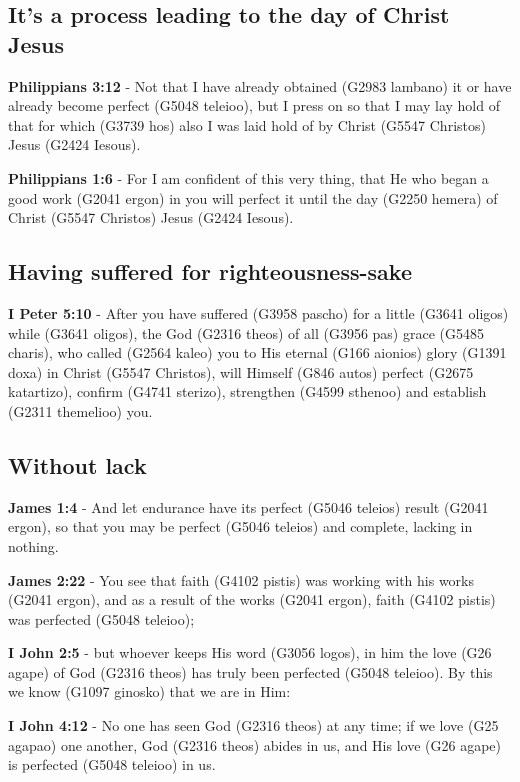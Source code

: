 \documentclass[11pt]{article}
\begin{document}
\subsection{It's a process leading to the day of Christ Jesus}
\label{sec:org4582511}
\textbf{Philippians 3:12} - Not that I have already obtained (G2983 lambano) it or have already become perfect (G5048 teleioo), but I press on so that I may lay hold of that for which (G3739 hos) also I was laid hold of by Christ (G5547 Christos) Jesus (G2424 Iesous).

\textbf{Philippians 1:6} - For I am confident of this very thing, that He who began a good work (G2041 ergon) in you will perfect it until the day (G2250 hemera) of Christ (G5547 Christos) Jesus (G2424 Iesous).

\subsection{Having suffered for righteousness-sake}
\label{sec:org2d60e89}
\textbf{I Peter 5:10} - After you have suffered (G3958 pascho) for a little (G3641 oligos) while (G3641 oligos), the God (G2316 theos) of all (G3956 pas) grace (G5485 charis), who called (G2564 kaleo) you to His eternal (G166 aionios) glory (G1391 doxa) in Christ (G5547 Christos), will Himself (G846 autos) perfect (G2675 katartizo), confirm (G4741 sterizo), strengthen (G4599 sthenoo) and establish (G2311 themelioo) you.

\subsection{Without lack}
\label{sec:orgbc93240}
\textbf{James 1:4} - And let endurance have its perfect (G5046 teleios) result (G2041 ergon), so that you may be perfect (G5046 teleios) and complete, lacking in nothing.

\textbf{James 2:22} - You see that faith (G4102 pistis) was working with his works (G2041 ergon), and as a result of the works (G2041 ergon), faith (G4102 pistis) was perfected (G5048 teleioo);

\textbf{I John 2:5} - but whoever keeps His word (G3056 logos), in him the love (G26 agape) of God (G2316 theos) has truly been perfected (G5048 teleioo). By this we know (G1097 ginosko) that we are in Him:

\textbf{I John 4:12} - No one has seen God (G2316 theos) at any time; if we love (G25 agapao) one another, God (G2316 theos) abides in us, and His love (G26 agape) is perfected (G5048 teleioo) in us.
\end{document}

